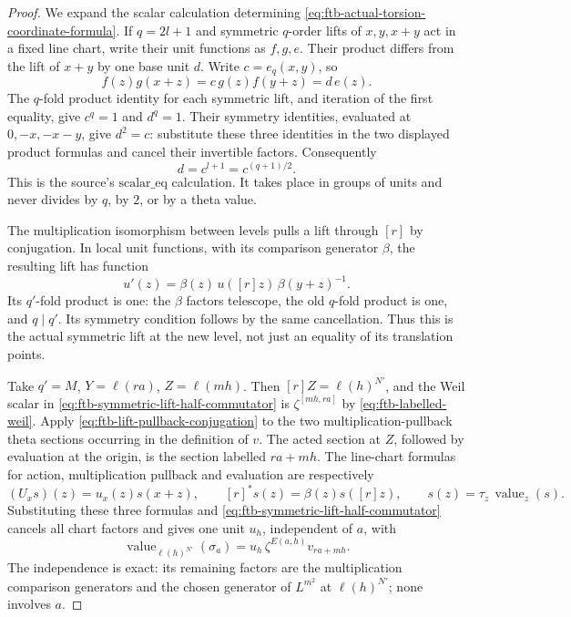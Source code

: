\begin{proof}
We expand the scalar calculation determining
\eqref{eq:ftb-actual-torsion-coordinate-formula}.
If \(q=2l+1\) and symmetric \(q\)-order lifts of \(x,y,x+y\)
act in a fixed line chart, write their unit functions
as \(f,g,e\).
Their product differs from the lift of \(x+y\) by one
base unit \(d\).
Write \(c=e_q(x,y)\), so
\[
                   f(z)g(x+z)=c\,g(z)f(y+z)
                              =d\,e(z).
\]
The \(q\)-fold product identity for each symmetric
lift, and iteration of the first equality, give
\(c^q=1\) and \(d^q=1\).
Their symmetry identities, evaluated at
\(0,-x,-x-y\), give \(d^2=c\):
substitute these three identities in the two displayed
product formulas and cancel their invertible factors.
Consequently
\[
                         d=c^{l+1}=c^{(q+1)/2}.
 \tag{TE8}\label{eq:ftb-symmetric-lift-half-commutator}
\]
This is the source's \(\mathrm{scalar\_eq}\) calculation.
It takes place in groups of units and never divides
by \(q\), by \(2\), or by a theta value.

The multiplication isomorphism between levels pulls a
lift through \([r]\) by conjugation.
In local unit functions, with its comparison generator
\(\beta\), the resulting lift has function
\[
                   u'(z)=\beta(z)\,u([r]z)\,
                                         \beta(y+z)^{-1}.
 \tag{TE9}\label{eq:ftb-lift-pullback-conjugation}
\]
Its \(q'\)-fold product is one: the \(\beta\) factors
telescope, the old \(q\)-fold product is one, and
\(q\mid q'\).
Its symmetry condition follows by the same cancellation.
Thus this is the actual symmetric lift at the new
level, not just an equality of its translation points.

Take \(q'=M\), \(Y=\ell(ra)\), \(Z=\ell(mh)\).
Then \([r]Z=\ell(h)^{N'}\), and the Weil scalar in
\eqref{eq:ftb-symmetric-lift-half-commutator} is
\(\zeta^{[mh,ra]}\) by
\eqref{eq:ftb-labelled-weil}.
Apply \eqref{eq:ftb-lift-pullback-conjugation}
to the two multiplication-pullback theta sections
occurring in the definition of \(v\).
The acted section at \(Z\), followed by evaluation at
the origin, is the section labelled \(ra+mh\).
The line-chart formulas for action, multiplication
pullback and evaluation are respectively
\[
 (U_xs)(z)=u_x(z)s(x+z),\qquad
              [r]^*s(z)=\beta(z)s([r]z),\qquad
                             s(z)=\tau_z\,\operatorname{value}_z(s).
\]
Substituting these three formulas and
\eqref{eq:ftb-symmetric-lift-half-commutator} cancels
all chart factors and gives one unit \(u_h\), independent
of \(a\), with
\[
          \operatorname{value}_{\ell(h)^{N'}}(\sigma_a)
                           =u_h\,\zeta^{E(a,h)}v_{ra+mh}.
 \tag{TE10}\label{eq:ftb-common-unit-torsion-values}
\]
The independence is exact: its remaining factors are
the multiplication comparison generators and the
chosen generator of \(L^{m^2}\) at \(\ell(h)^{N'}\);
none involves \(a\).


\end{proof}
